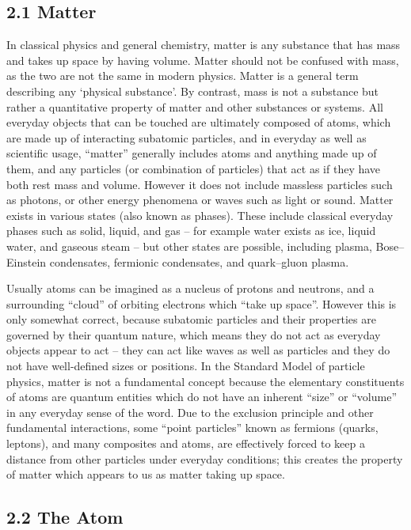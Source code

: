 \documentclass[
]{article}
\theoremstyle{definition}
\theoremstyle{definition}
\theoremstyle{definition}
\theoremstyle{remark}
\begin{document}
\hypertarget{matter}{%
\subsection{\texorpdfstring{{2.1} Matter}{2.1 Matter}}\label{matter}}

In classical physics and general chemistry, matter is any substance that
has mass and takes up space by having volume. Matter should not be
confused with mass, as the two are not the same in modern physics.
Matter is a general term describing any `physical substance'. By
contrast, mass is not a substance but rather a quantitative property of
matter and other substances or systems. All everyday objects that can be
touched are ultimately composed of atoms, which are made up of
interacting subatomic particles, and in everyday as well as scientific
usage, ``matter'' generally includes atoms and anything made up of them,
and any particles (or combination of particles) that act as if they have
both rest mass and volume. However it does not include massless
particles such as photons, or other energy phenomena or waves such as
light or sound. Matter exists in various states (also known as phases).
These include classical everyday phases such as solid, liquid, and gas
-- for example water exists as ice, liquid water, and gaseous steam --
but other states are possible, including plasma, Bose--Einstein
condensates, fermionic condensates, and quark--gluon plasma.

Usually atoms can be imagined as a nucleus of protons and neutrons, and
a surrounding ``cloud'' of orbiting electrons which ``take up space''.
However this is only somewhat correct, because subatomic particles and
their properties are governed by their quantum nature, which means they
do not act as everyday objects appear to act -- they can act like waves
as well as particles and they do not have well-defined sizes or
positions. In the Standard Model of particle physics, matter is not a
fundamental concept because the elementary constituents of atoms are
quantum entities which do not have an inherent ``size'' or ``volume'' in
any everyday sense of the word. Due to the exclusion principle and other
fundamental interactions, some ``point particles'' known as fermions
(quarks, leptons), and many composites and atoms, are effectively forced
to keep a distance from other particles under everyday conditions; this
creates the property of matter which appears to us as matter taking up
space.

\hypertarget{the-atom}{%
\subsection{\texorpdfstring{{2.2} The
Atom}{2.2 The Atom}}\label{the-atom}}
\end{document}

